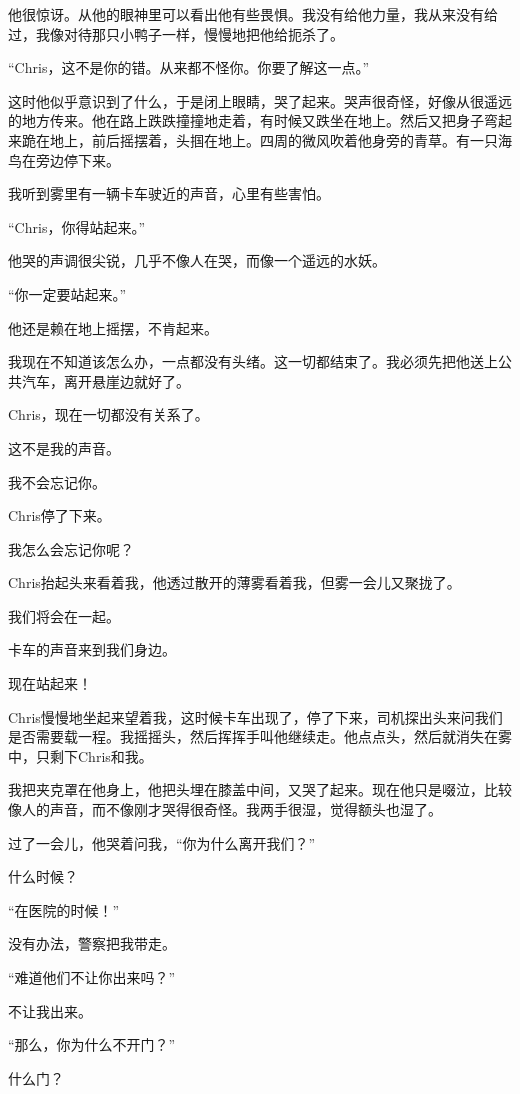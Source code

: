 \documentclass[UTF8]{article}
\begin{document}
\par 他很惊讶。从他的眼神里可以看出他有些畏惧。我没有给他力量，我从来没有给过，我像对待那只小鸭子一样，慢慢地把他给扼杀了。
\par “Chris，这不是你的错。从来都不怪你。你要了解这一点。”
\par 这时他似乎意识到了什么，于是闭上眼睛，哭了起来。哭声很奇怪，好像从很遥远的地方传来。他在路上跌跌撞撞地走着，有时候又跌坐在地上。然后又把身子弯起来跪在地上，前后摇摆着，头掴在地上。四周的微风吹着他身旁的青草。有一只海鸟在旁边停下来。
\par 我听到雾里有一辆卡车驶近的声音，心里有些害怕。
\par “Chris，你得站起来。”
\par 他哭的声调很尖锐，几乎不像人在哭，而像一个遥远的水妖。
\par “你一定要站起来。”
\par 他还是赖在地上摇摆，不肯起来。
\par 我现在不知道该怎么办，一点都没有头绪。这一切都结束了。我必须先把他送上公共汽车，离开悬崖边就好了。
\par Chris，现在一切都没有关系了。
\par 这不是我的声音。
\par 我不会忘记你。
\par Chris停了下来。
\par 我怎么会忘记你呢？
\par Chris抬起头来看着我，他透过散开的薄雾看着我，但雾一会儿又聚拢了。
\par 我们将会在一起。
\par 卡车的声音来到我们身边。
\par 现在站起来！
\par Chris慢慢地坐起来望着我，这时候卡车出现了，停了下来，司机探出头来问我们是否需要载一程。我摇摇头，然后挥挥手叫他继续走。他点点头，然后就消失在雾中，只剩下Chris和我。
\par 我把夹克罩在他身上，他把头埋在膝盖中间，又哭了起来。现在他只是啜泣，比较像人的声音，而不像刚才哭得很奇怪。我两手很湿，觉得额头也湿了。
\par 过了一会儿，他哭着问我，“你为什么离开我们？”
\par 什么时候？
\par “在医院的时候！”
\par 没有办法，警察把我带走。
\par “难道他们不让你出来吗？”
\par 不让我出来。
\par “那么，你为什么不开门？”
\par 什么门？
\end{document}
